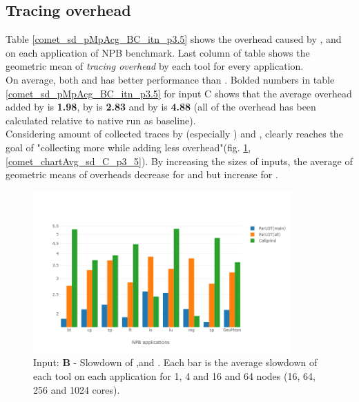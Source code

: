 

\subsection{Tracing overhead}
\label{subsec:lowtoh}



Table \ref{comet_sd_pMpAcg_BC_itn_p3.5} shows the overhead caused by \parlotm, \parlota and \callgrind on each application of NPB benchmark. Last column of table shows the geometric mean of \textit{tracing overhead} by each tool for every application.
\\
On average, both \parlotm and \parlota has better performance than \callgrind. Bolded numbers in table \ref{comet_sd_pMpAcg_BC_itn_p3.5} for input C shows that the average overhead added by \parlotm is \textbf{1.98}, by \parlota is \textbf{2.83} and by \callgrind is \textbf{4.88} (all of the overhead has been calculated relative to native run as baseline). 
\\
Considering amount of collected traces by \parlot (especially \parlota) and \callgrind, clearly \parlot reaches the goal of "collecting more while adding less overhead"(fig. \ref{comet_chartAvg_sd_B_p3_5},\ref{comet_chartAvg_sd_C_p3_5}). By increasing the sizes of inputs, the average of geometric means of overheads decrease for \parlotm and \parlota but increase for \callgrind. 


\begin{figure}[!t]
\centering
\includegraphics[width=3.9in]{figs.comet.newMed/comet_chartAvg_sd_B_p3_5.png}
\caption{ Input: \textbf{B} - Slowdown of \parlotm ,\parlota and \callgrind. Each bar is the average slowdown of each tool on each application for 1, 4 and 16 and 64 nodes (16, 64, 256 and 1024 cores). 
}
\label{comet_chartAvg_sd_B_p3_5}
\end{figure}


